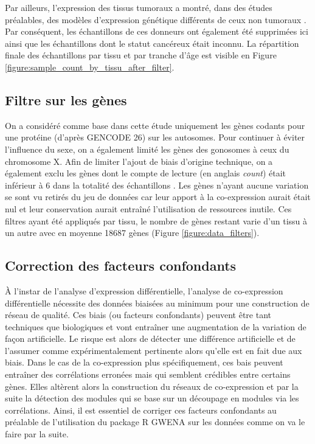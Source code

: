 Par ailleurs, l'expression des tissus tumoraux a montré, dans des études préalables, des modèles d'expression génétique différents de ceux non tumoraux . Par conséquent, les échantillons de ces donneurs ont également été supprimées ici ainsi que les échantillons dont le statut cancéreux était inconnu. La répartition finale des échantillons par tissu et par tranche d'âge est visible en Figure \ref{figure:sample_count_by_tissu_after_filter}.


\subsection{Filtre sur les gènes}

On a considéré comme base dans cette étude uniquement les gènes codants pour une protéine (d'après GENCODE 26) sur les autosomes. Pour continuer à éviter l'influence du sexe, on a également limité les gènes des gonosomes à ceux du chromosome X. Afin de limiter l'ajout de biais d'origine technique, on a également exclu les gènes dont le compte de lecture (en anglais \textit{count}) était inférieur à 6 dans la totalité des échantillons . Les gènes n'ayant aucune variation se sont vu retirés du jeu de données car leur apport à la co-expression aurait était nul et leur conservation aurait entraîné l'utilisation de ressources inutile. Ces filtres ayant été appliqués par tissu, le nombre de gènes restant varie d'un tissu à un autre avec en moyenne 18687 gènes (Figure \ref{figure:data_filters}).



\subsection{Correction des facteurs confondants}

À l'instar de l'analyse d'expression différentielle, l'analyse de co-expression différentielle nécessite des données biaisées au minimum pour une construction de réseau de qualité. Ces biais (ou facteurs confondants) peuvent être tant techniques que biologiques et vont entraîner une augmentation de la variation de façon artificielle. Le risque est alors de détecter une différence artificielle et de l'assumer comme expérimentalement pertinente alors qu'elle est en fait due aux biais. Dans le cas de la co-expression plus spécifiquement, ces bais peuvent entraîner des corrélations erronées mais qui semblent crédibles entre certains gènes. Elles altèrent alors la construction du réseaux de co-expression et par la suite la détection des modules qui se base sur un découpage en modules via les corrélations. Ainsi, il est essentiel de corriger ces facteurs confondants au préalable de l'utilisation du package R GWENA  sur les données comme on va le faire par la suite.

